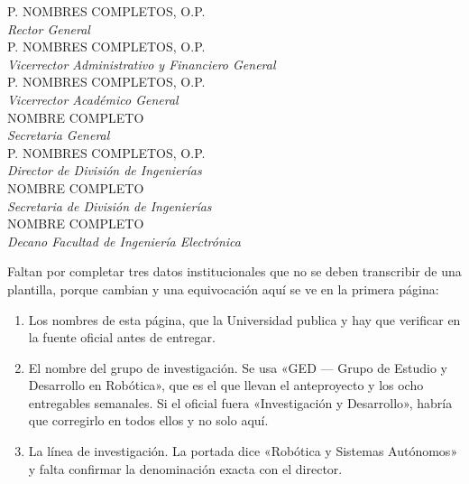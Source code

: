
\begin{center}
P. NOMBRES COMPLETOS, O.P.\\ \textit{Rector General}\\[0.7cm]
P. NOMBRES COMPLETOS, O.P.\\ \textit{Vicerrector Administrativo y Financiero General}\\[0.7cm]
P. NOMBRES COMPLETOS, O.P.\\ \textit{Vicerrector Académico General}\\[0.7cm]
NOMBRE COMPLETO\\ \textit{Secretaria General}\\[0.7cm]
P. NOMBRES COMPLETOS, O.P.\\ \textit{Director de División de Ingenierías}\\[0.7cm]
NOMBRE COMPLETO\\ \textit{Secretaria de División de Ingenierías}\\[0.7cm]
NOMBRE COMPLETO\\ \textit{Decano Facultad de Ingeniería Electrónica}
\end{center}

\vspace{1em}
\begin{notarevisor}
Faltan por completar tres datos institucionales que no se deben transcribir de
una plantilla, porque cambian y una equivocación aquí se ve en la primera
página:

\begin{enumerate}[leftmargin=*,nosep]
  \item Los nombres de esta página, que la Universidad publica y hay que
    verificar en la fuente oficial antes de entregar.
  \item El nombre del grupo de investigación. Se usa «GED — Grupo de Estudio y
    Desarrollo en Robótica», que es el que llevan el anteproyecto y los ocho
    entregables semanales. Si el oficial fuera «Investigación y Desarrollo»,
    habría que corregirlo en todos ellos y no solo aquí.
  \item La línea de investigación. La portada dice «Robótica y Sistemas
    Autónomos» y falta confirmar la denominación exacta con el director.
\end{enumerate}
\end{notarevisor}
